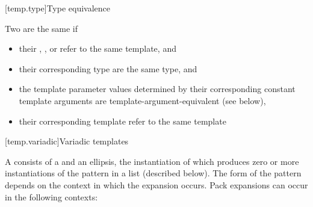 \documentclass{wg21}
\begin{document}
[temp.type]{Type equivalence}

\pnum
{}%
Two  are the same if
\begin{itemize}
\item
their ,
, or
refer to the same template, and

\item
their corresponding type 
are the same type, and

\item
the template parameter values determined by
their corresponding constant template arguments 
are template-argument-equivalent (see below), 

\item
their corresponding template 
refer to the same template

\end{itemize}

[temp.variadic]{Variadic templates}

\pnum
{}%
A 
consists of a  and an ellipsis, the instantiation of which
produces zero or more instantiations of the pattern in a list (described below).
The form of the pattern
depends on the context in which the expansion occurs. Pack
expansions can occur in the following contexts:
\end{document}
